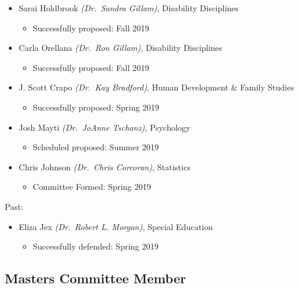 \documentclass[11pt,a4paper,]{moderncv}
\providecommand{\tightlist}{%
	\setlength{\itemsep}{0pt}\setlength{\parskip}{0pt}}
\begin{document}
\begin{itemize}
\tightlist
\item
  Sarai Holdbrook \emph{(Dr.~Sandra Gillam)}, Disability Disciplines

  \begin{itemize}
  \tightlist
  \item
    Successfully proposed: Fall 2019
  \end{itemize}
\item
  Carla Orellana \emph{(Dr.~Ron Gillam)}, Disability Disciplines

  \begin{itemize}
  \tightlist
  \item
    Successfully proposed: Fall 2019
  \end{itemize}
\item
  J. Scott Crapo \emph{(Dr.~Kay Bradford)}, Human Development \& Family
  Studies

  \begin{itemize}
  \tightlist
  \item
    Successfully proposed: Spring 2019
  \end{itemize}
\item
  Josh Mayti \emph{(Dr.~JoAnne Tschanz)}, Psychology

  \begin{itemize}
  \tightlist
  \item
    Scheduled proposed: Summer 2019
  \end{itemize}
\item
  Chris Johnson \emph{(Dr.~Chris Corcoran)}, Statistics

  \begin{itemize}
  \tightlist
  \item
    Committee Formed: Spring 2019
  \end{itemize}
\end{itemize}

Past:

\begin{itemize}
\tightlist
\item
  Eliza Jex \emph{(Dr.~Robert L. Morgan)}, Special Education

  \begin{itemize}
  \tightlist
  \item
    Successfully defended: Spring 2019
  \end{itemize}
\end{itemize}

\hypertarget{masters-committee-member}{%
\subsection{Masters Committee Member}\label{masters-committee-member}}
\end{document}
